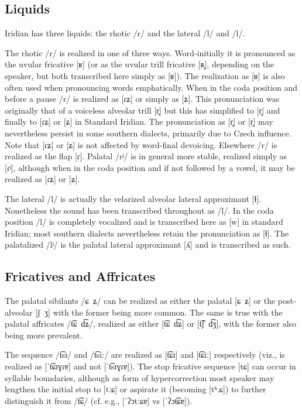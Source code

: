 \subsection{Liquids}

Iridian has three liquids: the rhotic /r/ and the lateral /l/ and /l/.

The rhotic /r/ is realized in one of three ways. Word-initially it is pronounced as the uvular fricative [ʁ] (or as the uvular trill fricative [ʀ̝], depending on the speaker, but both transcribed here simply as [ʁ]). The realization as [ʁ] is also often used when pronouncing words emphatically. When in the coda position and before a pause /r/ is realized as [ɾʑ] or simply as [ʑ]. This pronunciation was originally that of a voiceless alveolar trill [r̥] but this has simplified to [r̝] and finally to [ɾʑ] or [ʑ] in Standard Iridian. The  pronunciation as [r̥] or [r̝] may nevertheless persist in some southern dialects, primarily due to Czech influence. Note that [ɾʑ] or [ʑ] is not affected by word-final devoicing. Elsewhere /r/ is realized as the flap [ɾ]. Palatal /rʲ/ is in general more stable, realized simply as [ɾʲ], although when in the coda position and if not followed by a vowel, it may be realized as [ɾʑ] or [ʑ].

The lateral /l/ is actually the velarized alveolar lateral approximant [ɫ]. Nonetheless the sound has been transcribed throughout as /l/. In the coda position /l/ is completely vocalized and is transcribed here as [w] in standard Iridian; most southern dialects nevertheless retain the pronunciation as [ɫ]. The palatalized /lʲ/ is the palatal lateral approximant [ʎ] and is transcribed as such.

\subsection{Fricatives and Affricates}

The palatal sibilants /ɕ~ʑ/ can be realized as either the palatal [ɕ~ʑ] or
the post-alveolar [ʃ~ʒ] with the former being more common. The same is true
with the palatal affricates /t͡ɕ~d͡ʑ/, realized as either [t͡ɕ~d͡ʑ] or [t͡ʃ~d͡ʒ],
with the former also being more prevalent.

The sequence /t͡sɪ/ and /t͡si:/ are realized as [t͡ɕɪ] and [t͡ɕiː] respectively
(viz.,  is realized as [ˈt͡ɕɪɣɾɐ] and not [ˈt͡sɪɣɾɐ]).
The stop fricative sequence [tɕ] can occur in syllable boundaries,
although as form of hypercorrection most speaker may lengthen the initial
stop to [tːɕ] or aspirate it (becoming [tʰ.ɕ]) to further distinguish it
from /t͡ɕ/ (cf. e.g.,  [ˈʔɔtːɕɐ] vs 
[ˈʔɔt͡ɕɐ]).

